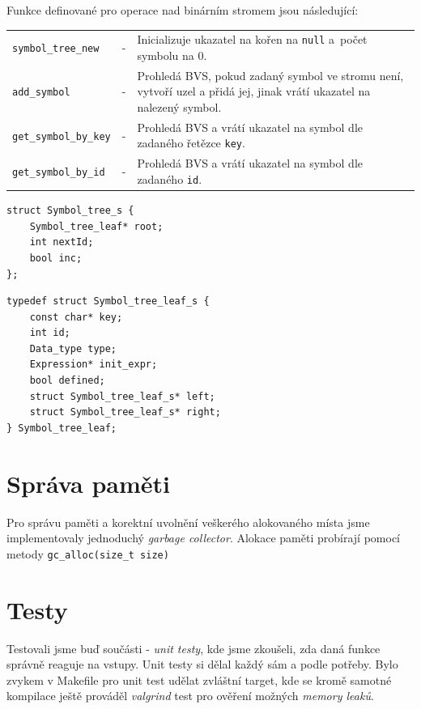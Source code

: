 \documentclass[a4paper,11pt]{article}
\begin{document}
Funkce definované pro operace nad binárním stromem jsou následující:\medskip

\begin{tabular}{llp{11.9cm}}
	\texttt{symbol\_tree\_new}  & - & Inicializuje ukazatel na kořen na \texttt{null} a~počet symbolu na 0.\\
	\texttt{add\_symbol}    & - & Prohledá BVS, pokud zadaný symbol ve stromu není, vytvoří uzel a přidá jej, jinak vrátí ukazatel na nalezený symbol. \\
	\texttt{get\_symbol\_by\_key} & - & Prohledá BVS a vrátí ukazatel na symbol dle zadaného řetězce \texttt{key}. \\	
	\texttt{get\_symbol\_by\_id} & - & Prohledá BVS a vrátí ukazatel na symbol dle zadaného \texttt{id}. \\
\end{tabular}
\medskip	
\begin{lstlisting}[caption={Struktura binárního stromu}, label={lst:stBvsStruct}]
struct Symbol_tree_s {
    Symbol_tree_leaf* root;
    int nextId;
    bool inc;
};
\end{lstlisting}

\begin{lstlisting}[caption={Struktura uzlu binárního stromu}, label={lst:stBvsLeafStruct}]
typedef struct Symbol_tree_leaf_s {
	const char* key;
	int id;
	Data_type type;
	Expression* init_expr;
	bool defined;
	struct Symbol_tree_leaf_s* left;
	struct Symbol_tree_leaf_s* right;
} Symbol_tree_leaf;
\end{lstlisting}

\section{Správa paměti}
Pro správu paměti a korektní uvolnění veškerého alokovaného místa jsme implementovaly jednoduchý \emph{garbage collector}. Alokace paměti probírají pomocí metody \texttt{gc\_alloc(size\_t size)}

\section{Testy}
Testovali jsme buď součásti - \textit{unit testy}, kde jsme zkoušeli, zda daná funkce správně reaguje na vstupy. Unit testy si dělal každý sám a podle potřeby. Bylo zvykem v Makefile pro unit test udělat zvláštní target, kde se kromě samotné kompilace ještě prováděl \textit{valgrind} test pro ověření možných \textit{memory leaků}. 
\end{document}
